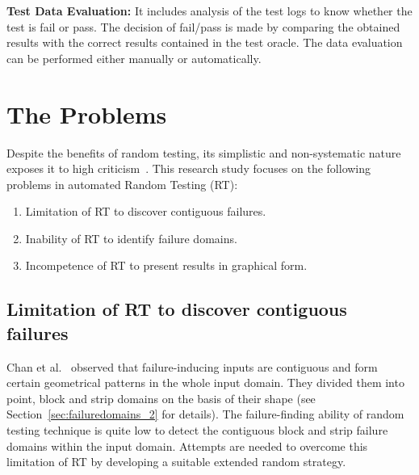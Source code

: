 \textbf{Test Data Evaluation:} It includes analysis of the test logs to know whether the test is fail or pass. The decision of fail/pass is made by comparing the obtained results with the correct results contained in the test oracle. The data evaluation can be performed either manually or automatically.

%

\section{The Problems}
Despite the benefits of random testing, its simplistic and non-systematic nature exposes it to high criticism~\cite{myers2011art, white1987software}. This research study focuses on the following problems in automated Random Testing (RT):


\begin{enumerate}
\item Limitation of RT to discover contiguous failures.
\item Inability of RT to identify failure domains.
\item Incompetence of RT to present results in graphical form. 
\end{enumerate}

\subsection{Limitation of RT to discover contiguous failures}
Chan et al.~\cite{chan1996proportional} observed that failure-inducing inputs are contiguous and form certain geometrical patterns in the whole input domain. They divided them into point, block and strip domains on the basis of their shape (see Section~\ref{sec:failuredomains_2} for details). %
The failure-finding ability of random testing technique is quite low to detect the contiguous block and strip failure domains within the input domain. Attempts are needed to overcome this limitation of RT by developing a suitable extended random strategy.

